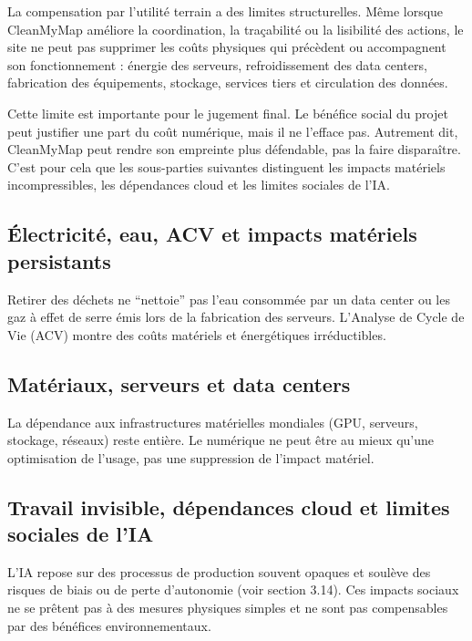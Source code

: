 \documentclass[
  10pt,
  a4paper,
  DIV=11,
  numbers=noendperiod,
  oneside]{scrreprt}
\begin{document}
La compensation par l'utilité terrain a des limites structurelles. Même
lorsque CleanMyMap améliore la coordination, la traçabilité ou la
lisibilité des actions, le site ne peut pas supprimer les coûts
physiques qui précèdent ou accompagnent son fonctionnement : énergie des
serveurs, refroidissement des data centers, fabrication des équipements,
stockage, services tiers et circulation des données.

Cette limite est importante pour le jugement final. Le bénéfice social
du projet peut justifier une part du coût numérique, mais il ne l'efface
pas. Autrement dit, CleanMyMap peut rendre son empreinte plus
défendable, pas la faire disparaître. C'est pour cela que les
sous-parties suivantes distinguent les impacts matériels
incompressibles, les dépendances cloud et les limites sociales de l'IA.

\subsection{Électricité, eau, ACV et impacts matériels
persistants}\label{uxe9lectricituxe9-eau-acv-et-impacts-matuxe9riels-persistants}

Retirer des déchets ne ``nettoie'' pas l'eau consommée par un data
center ou les gaz à effet de serre émis lors de la fabrication des
serveurs. L'Analyse de Cycle de Vie (ACV) montre des coûts matériels et
énergétiques irréductibles.

\subsection{Matériaux, serveurs et data
centers}\label{matuxe9riaux-serveurs-et-data-centers}

La dépendance aux infrastructures matérielles mondiales (GPU, serveurs,
stockage, réseaux) reste entière. Le numérique ne peut être au mieux
qu'une optimisation de l'usage, pas une suppression de l'impact
matériel.

\subsection{Travail invisible, dépendances cloud et limites sociales de
l'IA}\label{travail-invisible-duxe9pendances-cloud-et-limites-sociales-de-lia}

L'IA repose sur des processus de production souvent opaques et soulève
des risques de biais ou de perte d'autonomie (voir section 3.14). Ces
impacts sociaux ne se prêtent pas à des mesures physiques simples et ne
sont pas compensables par des bénéfices environnementaux.
\end{document}
